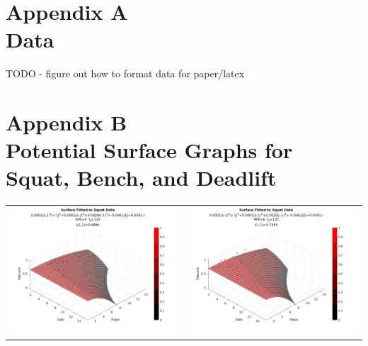 \appendix

\section{
    Appendix A
    \\
    \large{Data}
}
\label{sec:AppendixA}

TODO - figure out how to format data for paper/latex

\section{
    Appendix B
    \\
    \large{Potential Surface Graphs for Squat, Bench, and Deadlift}
}
\label{sec:AppendixB}

\begin{table}[h]
    \centering
    \begin{tabular}{c|c}
        \includegraphics[width=78mm]{SquatSurface/5.png} &  
        \includegraphics[width=78mm]{SquatSurface/6.png} \\
         

\end{tabular}
\end{table}
